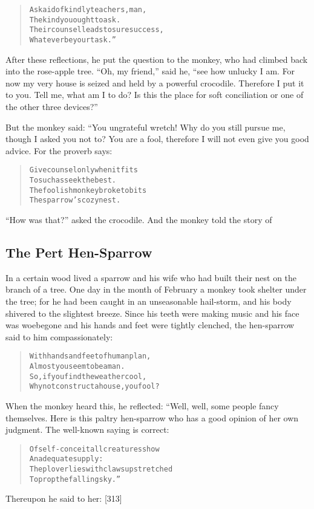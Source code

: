 \documentclass[article, twoside, 14pt]{memoir}
\renewenvironment{verbatim}{%
\begin{quote}%
\vskip -10pt%
\begin{alltt}\normalfont\large}{\end{alltt}%
\end{quote}%
\vskip -10pt
} %
\begin{document}
\begin{verbatim}
Ask aid of kindly teachers, man,
    The kind you ought to ask.
Their counsel leads to sure success,
    Whatever be your task.”
\end{verbatim}
After these reflections, he put the question to the monkey, who had
climbed back into the rose-apple tree. ``Oh, my friend,'' said he,
``see how unlucky I am. For now my very house is seized and held by a powerful crocodile. Therefore I put it to you. Tell me, what am I to do? Is this the place for soft conciliation or one of the other three devices?''

But the monkey said: “You ungrateful wretch! Why do you still
pursue me, though I asked you not to? You are a fool, therefore I
will not even give you good advice. For the proverb says:

\begin{verbatim}
Give counsel only when it fits
    To such as seek the best.
The foolish monkey broke to bits
    The sparrow's cozy nest.
\end{verbatim}
``How was that?'' asked the crocodile. And the monkey told the
story of

\subsection{The Pert Hen-Sparrow}

\label{s75}

In a certain wood lived a sparrow and his wife who had built their
nest on the branch of a tree. One day in the month of February a
monkey took shelter under the tree; for he had been caught in an
unseasonable hail-storm, and his body shivered to the slightest
breeze. Since his teeth were making music and his face was
woebegone and his hands and feet were tightly clenched, the
hen-sparrow said to him compassionately:

\begin{verbatim}
With hands and feet of human plan,
Almost you seem to be a man.
So, if you find the weather cool,
Why not construct a house, you fool?
\end{verbatim}
When the monkey heard this, he reflected: “Well, well, some people
fancy themselves. Here is this paltry hen-sparrow who has a good
opinion of her own judgment. The well-known saying is correct:

\begin{verbatim}
Of self-conceit all creatures show
    An adequate supply:
The plover lies with claws upstretched
    To prop the falling sky.”
\end{verbatim}
Thereupon he said to her: [313]
\end{document}
